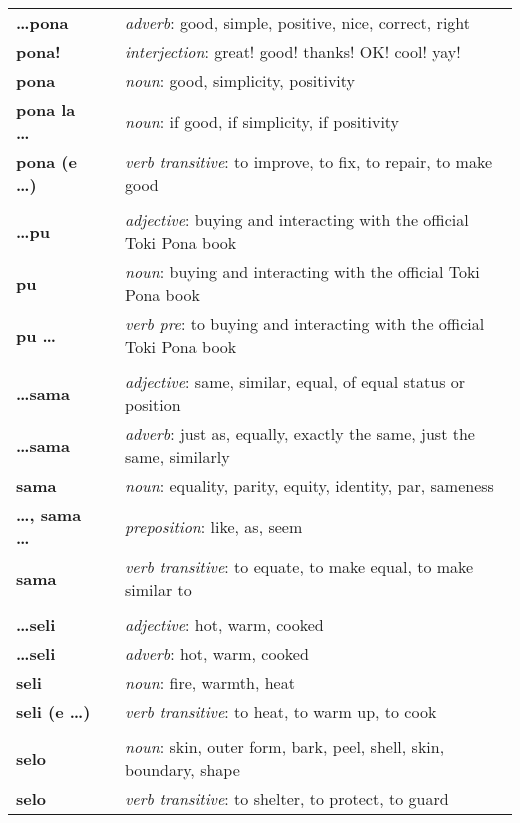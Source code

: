 \begin{supertabular}{p{2,5cm}|ll}
\textbf{\dots pona} && \textit{adverb}: good, simple, positive, nice, correct, right \\ 
\textbf{pona!} && \textit{interjection}: great! good! thanks! OK! cool! yay! \\ 
\textbf{pona} && \textit{noun}: good, simplicity, positivity \\ 
\textbf{pona la \dots} && \textit{noun}: if good, if simplicity, if positivity \\ 
\textbf{pona (e \dots)} && \textit{verb transitive}: to improve, to fix, to repair, to make good \\ 
 && \\ %
\textbf{\dots pu} && \textit{adjective}: buying and interacting with the official Toki Pona book \\ 
\textbf{pu} && \textit{noun}: buying and interacting with the official Toki Pona book \\ 
\textbf{pu \dots} && \textit{verb pre}: to buying and interacting with the official Toki Pona book \\ 
 && \\ %
\textbf{\dots sama} && \textit{adjective}: same, similar, equal, of equal status or position \\ 
\textbf{\dots sama} && \textit{adverb}: just as, equally, exactly the same, just the same, similarly \\ 
\textbf{sama} && \textit{noun}: equality, parity, equity, identity, par, sameness \\ 
\textbf{\dots , sama \dots} && \textit{preposition}: like, as, seem \\ 
\textbf{sama } && \textit{verb transitive}: to equate, to make equal, to make similar to \\ 
 && \\ %
\textbf{\dots seli} && \textit{adjective}: hot, warm, cooked \\ 
\textbf{\dots seli} && \textit{adverb}: hot, warm, cooked \\ 
\textbf{seli} && \textit{noun}: fire, warmth, heat \\ 
\textbf{seli (e \dots)} && \textit{verb transitive}: to heat, to warm up, to cook \\ 
 && \\ %
\textbf{selo} && \textit{noun}: skin, outer form, bark, peel, shell, skin, boundary, shape \\ 
\textbf{selo } && \textit{verb transitive}: to shelter, to protect, to guard \\ 

\end{supertabular}
